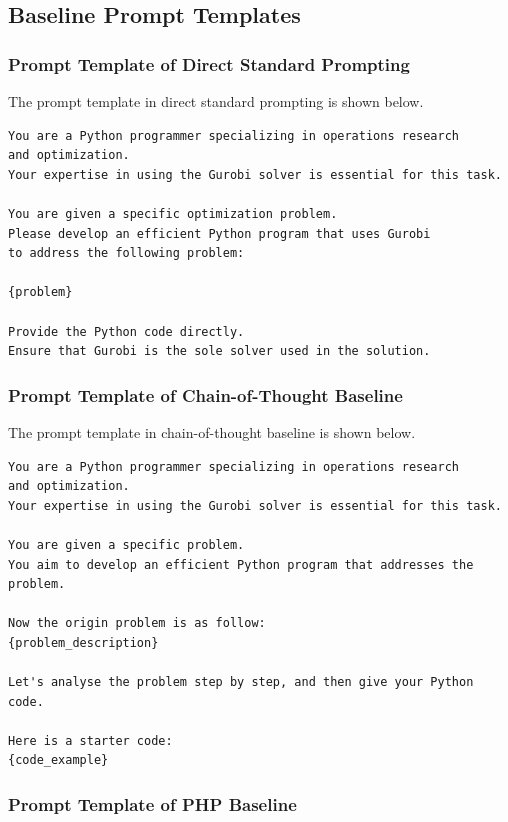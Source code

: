 \subsection{Baseline Prompt Templates}

\subsubsection{Prompt Template of Direct Standard Prompting}
\label{app:prompt_standard}

The prompt template in direct standard prompting is shown below.
\begin{lstlisting}[style=promptstyle]
You are a Python programmer specializing in operations research
and optimization.
Your expertise in using the Gurobi solver is essential for this task.

You are given a specific optimization problem.
Please develop an efficient Python program that uses Gurobi
to address the following problem:

{problem}

Provide the Python code directly.
Ensure that Gurobi is the sole solver used in the solution.
\end{lstlisting}

\subsubsection{Prompt Template of Chain-of-Thought Baseline}
\label{app:prompt_cot}

The prompt template in chain-of-thought baseline is shown below.
\begin{lstlisting}[style=promptstyle]
You are a Python programmer specializing in operations research
and optimization.
Your expertise in using the Gurobi solver is essential for this task.

You are given a specific problem.
You aim to develop an efficient Python program that addresses the problem.

Now the origin problem is as follow:
{problem_description}

Let's analyse the problem step by step, and then give your Python code.

Here is a starter code:
{code_example}
\end{lstlisting}

\subsubsection{Prompt Template of PHP Baseline}
\label{app:prompt_php}


